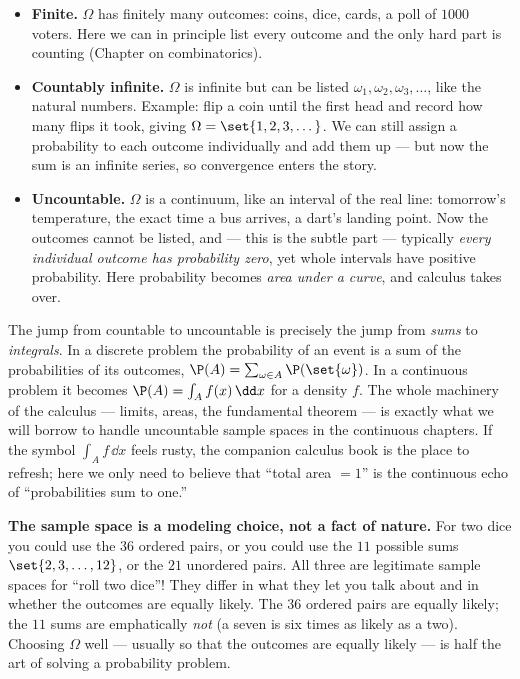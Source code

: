 \begin{itemize}
\item \textbf{Finite.} $\Omega$ has finitely many outcomes: coins, dice, cards, a
poll of $1000$ voters. Here we can in principle list every outcome and the only
hard part is counting (Chapter on combinatorics).
\item \textbf{Countably infinite.} $\Omega$ is infinite but can be listed
$\omega_1, \omega_2, \omega_3, \dots$, like the natural numbers. Example: flip a
coin until the first head and record how many flips it took, giving
$\Omega = \set{1, 2, 3, \dots}$. We can still assign a probability to each
outcome individually and add them up --- but now the sum is an infinite series,
so convergence enters the story.
\item \textbf{Uncountable.} $\Omega$ is a continuum, like an interval of the real
line: tomorrow's temperature, the exact time a bus arrives, a dart's landing
point. Now the outcomes cannot be listed, and --- this is the subtle part ---
typically \emph{every individual outcome has probability zero}, yet whole
intervals have positive probability. Here probability becomes \emph{area under a
curve}, and calculus takes over.
\end{itemize}

\begin{connectionbox}
The jump from countable to uncountable is precisely the jump from \emph{sums} to
\emph{integrals}. In a discrete problem the probability of an event is a sum of
the probabilities of its outcomes, $\P(A) = \sum_{\omega \in A} \P(\set{\omega})$.
In a continuous problem it becomes $\P(A) = \int_A f(x)\,\dd x$ for a density
$f$. The whole machinery of the calculus --- limits, areas, the fundamental
theorem --- is exactly what we will borrow to handle uncountable sample spaces in
the continuous chapters. If the symbol $\int_A f\,\dd x$ feels rusty, the
companion calculus book is the place to refresh; here we only need to believe
that ``total area $=1$'' is the continuous echo of ``probabilities sum to one.''
\end{connectionbox}

\begin{trapbox}
\textbf{The sample space is a modeling choice, not a fact of nature.} For two
dice you could use the $36$ ordered pairs, or you could use the $11$ possible
sums $\set{2,3,\dots,12}$, or the $21$ unordered pairs. All three are legitimate
sample spaces for ``roll two dice''! They differ in what they let you talk about
and in whether the outcomes are equally likely. The $36$ ordered pairs are
equally likely; the $11$ sums are emphatically \emph{not} (a seven is six times as
likely as a two). Choosing $\Omega$ well --- usually so that the outcomes are
equally likely --- is half the art of solving a probability problem.
\end{trapbox}

